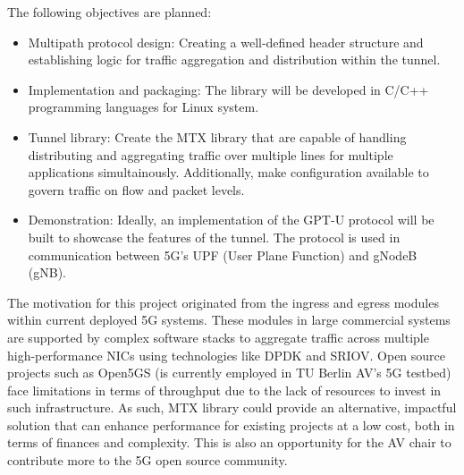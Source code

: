 \documentclass{article} %
\begin{document}
The following objectives are planned:
\begin{itemize}
    \item Multipath protocol design: Creating a well-defined header structure and establishing logic for traffic aggregation and distribution within the tunnel.
    \item Implementation and packaging: The library will be developed in C/C++ programming languages for Linux system.
    \item Tunnel library: Create the MTX library that are capable of handling distributing and aggregating traffic over multiple lines for multiple applications simultainously. 
    Additionally, make configuration available to govern traffic on flow and packet levels.
    \item Demonstration: Ideally, an implementation of the GPT-U protocol will be built to showcase the features of the tunnel. The protocol is used in communication between 5G's UPF (User Plane Function) and gNodeB (gNB).
\end{itemize}

The motivation for this project originated from the ingress and egress modules within current deployed 5G systems. 
These modules in large commercial systems are supported by complex software stacks to aggregate traffic across multiple high-performance NICs using technologies like DPDK and SRIOV.
Open source projects such as Open5GS (is currently employed in TU Berlin AV's 5G testbed) face limitations in terms of throughput due to the lack of resources to invest in such infrastructure.
As such, MTX library could provide an alternative, impactful solution that can enhance performance for existing projects at a low cost, both in terms of finances and complexity. 
This is also an opportunity for the AV chair to contribute more to the 5G open source community.
\\
\end{document}
